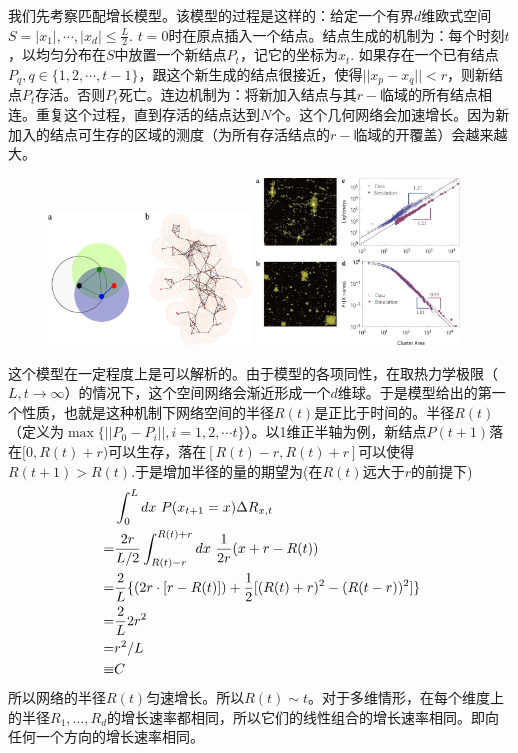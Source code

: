 我们先考察匹配增长模型\cite{zhang2015scaling}。该模型的过程是这样的：给定一个有界\(d\)维欧式空间\(S=|x_1|,\cdots,|x_d|\leq \frac{L}{2}.\) \(t=0\)时在原点插入一个结点。结点生成的机制为：每个时刻\(t\)，以均匀分布在\(S\)中放置一个新结点\(P_t\)，记它的坐标为\(x_t.\) 如果存在一个已有结点\(P_q,q\in\{1,2,\cdots,t-1\}\)，跟这个新生成的结点很接近，使得\(||x_p-x_q||< r\)，则新结点\(P_t\)存活。否则\(P_t\)死亡。连边机制为：将新加入结点与其\(r-\)临域的所有结点相连。重复这个过程，直到存活的结点达到\(N\)个。这个几何网络会加速增长。因为新加入的结点可生存的区域的测度（为所有存活结点的\(r-\)临域的开覆盖）会越来越大。
\begin{figure}
    \centering
    \includegraphics[width = 0.48\textwidth]{pictures/srep09767-f1.jpg}
    \includegraphics[width = 0.48\textwidth]{pictures/srep09767-f3.jpg}
\end{figure}

这个模型在一定程度上是可以解析的。由于模型的各项同性，在取热力学极限（$L,t\rightarrow\infty$）的情况下，这个空间网络会渐近形成一个$d$维球。于是模型给出的第一个性质，也就是这种机制下网络空间的半径$R(t)$是正比于时间的。半径\(R(t)\)（定义为\(\max\{||P_0-P_i||,i=1,2,\cdots t\}\)）。以1维正半轴为例，新结点\(P(t+1)\)落在\([0,R(t)+r)\)可以生存，落在\([R(t)-r,R(t)+r]\)可以使得\(R(t+1)> R(t).\)于是增加半径的量的期望为(在\(R(t)\)远大于\(r\)的前提下)
\begin{align}
  &\int_0^Ldx\ P(x_{t+1}=x)\Delta R_{x,t}\notag\\
  =& \frac{2r}{L/2}\int_{R(t)-r}^{R(t)+r} dx\ \frac{1}{2r} (x+r-R(t))\notag\\
  =& \frac{2}{L} \{(2r\cdot [r-R(t)]) +\frac{1}{2}[(R(t)+r)^2-(R(t-r))^2] \}\notag\\
  =& \frac{2}{L} 2r^2\notag\\
  =&r^2/L\notag\\\
  \equiv& C 
\end{align}
所以网络的半径\(R(t)\)匀速增长。所以\(R(t)\sim t\)。对于多维情形，在每个维度上的半径\(R_1,\ldots,R_d\)的增长速率都相同，所以它们的线性组合的增长速率相同。即向任何一个方向的增长速率相同。

